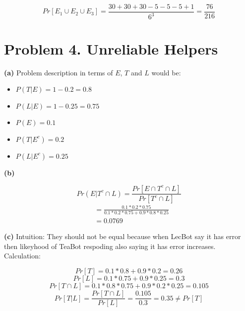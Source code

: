 \documentclass{article}
\begin{document}
\[Pr[E_1 \cup E_2 \cup E_3] = \frac{30 + 30 + 30 - 5 - 5 - 5 + 1}{6^3} = \frac{76}{216}\]

\section*{Problem 4. Unreliable Helpers}
\textbf{(a)}
Problem description in terms of $E$, $T$ and $L$ would be:
\begin{itemize}
    \item $P(T|E) = 1 - 0.2 = 0.8$
    \item $P(L|E) = 1 - 0.25 = 0.75$
    \item $P(E) = 0.1$
    \item $P(T|E^c) = 0.2$ 
    \item $P(L|E^c) = 0.25$ 
\end{itemize}

\vspace{\baselineskip}
\noindent\textbf{(b)}

\[Pr(E|T^c \cap L) = \frac{Pr[E \cap T^c \cap L]}{Pr[T^c \cap L]}\]
\[
\begin{aligned}
&= \frac{0.1 * 0.2 * 0.75}{0.1 * 0.2 * 0.75 + 0.9 * 0.8 * 0.25}\\
& = 0.0769
\end{aligned}
\]

\vspace{\baselineskip}
\noindent\textbf{(c)}
Intuition: They should not be equal because when LecBot say it has error then likeyhood of TeaBot respoding also saying it has error increases.
Calculation:

\[Pr[T] = 0.1 * 0.8 + 0.9 * 0.2 = 0.26\]
\[Pr[L] = 0.1 * 0.75 + 0.9 * 0.25 = 0.3\]
\[Pr[T \cap L] = 0.1 * 0.8 * 0.75 + 0.9 * 0.2 * 0.25 = 0.105 \]
\[Pr[T|L] = \frac{Pr[T \cap L]}{Pr[L]} = \frac{0.105}{0.3} = 0.35 \neq Pr[T]\]
\end{document}
